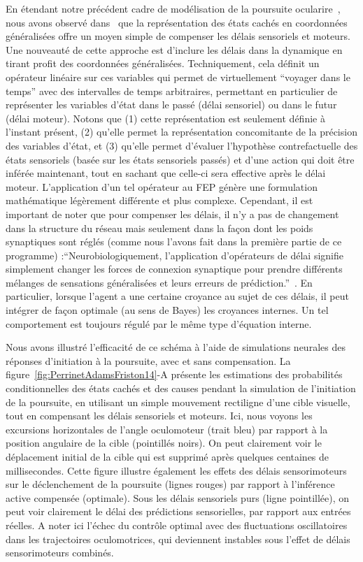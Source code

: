 \documentclass[11pt,french,a4paper,oneside]{article}%
\begin{document}
En étendant notre précédent cadre de modélisation de la poursuite ocularire~\citep{Adams12},
nous avons observé dans~\citep{PerrinetAdamsFriston14}
que la représentation des états cachés en coordonnées généralisées offre
un moyen simple de compenser les délais sensoriels et moteurs. Une nouveauté de cette
approche est d'inclure les délais dans la dynamique en tirant profit
des coordonnées généralisées. Techniquement, cela définit un opérateur
linéaire sur ces variables qui permet de virtuellement ``voyager dans le temps''
 avec des intervalles
de temps arbitraires, permettant en particulier de représenter les
variables d'état dans le passé (délai sensoriel) ou dans le futur
(délai moteur). Notons que (1) cette représentation est seulement définie à
l'instant présent, (2) qu'elle permet la représentation concomitante de
la précision des variables d'état, et (3) qu'elle permet d'évaluer
l'hypothèse contrefactuelle des états sensoriels (basée sur les états
sensoriels passés) et d'une action qui doit être inférée maintenant,
tout en sachant que celle-ci sera effective après le délai moteur.
L'application d'un tel opérateur au FEP génère une formulation
mathématique légèrement différente et plus complexe. Cependant, il est
important de noter que pour compenser les délais, il n'y a pas de
changement dans la structure du réseau mais seulement dans la façon dont
les poids synaptiques sont réglés (comme nous l'avons fait dans la
première partie de ce programme) :``Neurobiologiquement, l'application
d'opérateurs de délai signifie simplement changer les forces de
connexion synaptique pour prendre différents mélanges de sensations
généralisées et leurs erreurs de prédiction.''~\citep[section 3.1, ma traduction]{PerrinetAdamsFriston14}. En particulier, lorsque l'agent a une
certaine croyance au sujet de ces délais, il peut intégrer de façon
optimale (au sens de Bayes) les croyances internes. Un tel comportement est
toujours régulé par le même type d'équation interne.

Nous avons illustré l'efficacité de ce schéma à l'aide de simulations
neurales des réponses d'initiation à la poursuite, avec et sans
compensation. La figure~\ref{fig:PerrinetAdamsFriston14}-A présente les estimations des probabilités conditionnelles
des états cachés et des causes pendant la simulation de l'initiation de
la poursuite, en utilisant un simple mouvement rectiligne d'une cible visuelle, tout
en compensant les délais sensoriels et moteurs. Ici, nous voyons les
excursions horizontales de l'angle oculomoteur (trait bleu) par rapport à la
position angulaire de la cible (pointillés noirs). %
On peut clairement voir
le déplacement initial de la cible qui est supprimé après
quelques centaines de millisecondes. Cette figure illustre également les
effets des délais sensorimoteurs sur le déclenchement de la poursuite
(lignes rouges) par rapport à l'inférence active compensée (optimale).
Sous les délais sensoriels purs (ligne pointillée), on peut voir
clairement le délai des prédictions sensorielles, par rapport aux
entrées réelles. A noter ici l'échec du contrôle optimal avec des
fluctuations oscillatoires dans les trajectoires oculomotrices, qui
deviennent instables sous l'effet de délais sensorimoteurs combinés.
\end{document}
